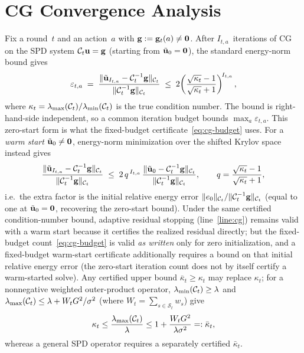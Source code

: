 \section{CG Convergence Analysis}\label{app:cg}

Fix a round~$t$ and an action~$a$ with $\mathbf{g}:=\mathbf{g}_t(a)\ne\mathbf0$.  After
$I_{t,a}$~iterations of CG on the SPD system $\mathcal{C}_t\mathbf{u}=\mathbf{g}$ (starting
from $\tilde{\mathbf{u}}_0=\mathbf{0}$), the standard energy-norm bound gives
\[
  \varepsilon_{t,a}
  \;=\;
  \frac{\|\tilde{\mathbf{u}}_{I_{t,a}} - \mathcal{C}_t^{-1}\mathbf{g}\|_{\mathcal{C}_t}}
       {\|\mathcal{C}_t^{-1}\mathbf{g}\|_{\mathcal{C}_t}}
  \;\le\;
  2\!\left(\frac{\sqrt{\kappa_t}-1}{\sqrt{\kappa_t}+1}\right)^{\!I_{t,a}},
\]
where $\kappa_t=\lambda_{\max}(\mathcal{C}_t)/\lambda_{\min}(\mathcal{C}_t)$
is the true condition number.  The bound is right-hand-side independent, so a
common iteration budget bounds $\max_a\varepsilon_{t,a}$.  This zero-start form is
what the fixed-budget certificate~\eqref{eq:cg-budget} uses.
For a \emph{warm start} $\tilde{\mathbf{u}}_0\ne\mathbf0$, energy-norm minimization over the
shifted Krylov space instead gives
\[
  \frac{\|\tilde{\mathbf{u}}_{I_{t,a}}-\mathcal{C}_t^{-1}\mathbf{g}\|_{\mathcal{C}_t}}{\|\mathcal{C}_t^{-1}\mathbf{g}\|_{\mathcal{C}_t}}
  \;\le\;
  2\,q^{\,I_{t,a}}\,
  \frac{\|\tilde{\mathbf{u}}_0-\mathcal{C}_t^{-1}\mathbf{g}\|_{\mathcal{C}_t}}{\|\mathcal{C}_t^{-1}\mathbf{g}\|_{\mathcal{C}_t}},
  \qquad q=\frac{\sqrt{\kappa_t}-1}{\sqrt{\kappa_t}+1},
\]
i.e.\ the extra factor is the initial relative energy error $\|e_0\|_{\mathcal{C}_t}/
\|\mathcal{C}_t^{-1}\mathbf{g}\|_{\mathcal{C}_t}$ (equal to one at $\tilde{\mathbf{u}}_0=\mathbf0$, recovering the
  zero-start bound).  Under the same certified condition-number bound, adaptive
residual stopping (line~\ref{line:cg}) remains valid with a warm start because it
certifies the realized residual directly; but the fixed-budget
count~\eqref{eq:cg-budget} is valid \emph{as written} only for zero initialization,
and a fixed-budget warm-start certificate additionally requires a bound on that
initial relative energy error (the zero-start iteration count does not by itself
certify a warm-started solve).
Any certified upper bound $\bar\kappa_t\ge\kappa_t$ may replace $\kappa_t$; for a
nonnegative weighted outer-product operator,
$\lambda_{\min}(\mathcal{C}_t)\ge\lambda$ and
$\lambda_{\max}(\mathcal{C}_t)\le\lambda+W_tG^2/\sigma^2$
(where $W_t=\sum_{s\in\mathcal{S}_t}w_s$) give
\[
\kappa_t\le\frac{\lambda_{\max}(\mathcal{C}_t)}{\lambda}
\le1+\frac{W_tG^2}{\lambda\sigma^2}=: \bar\kappa_t,
\]
whereas a general SPD operator
requires a separately certified $\bar\kappa_t$.

